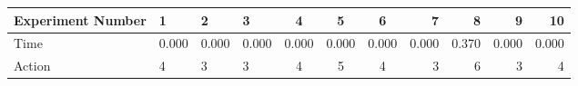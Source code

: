 \documentclass[8pt]{article}
\begin{document}
\begin{landscape}
\begin{tabular}{ | l | l | l | l | c | c | c | r | r | r | r | }
 \hline 
Experiment Number & 1 & 2 & 3 & 4 & 5 & 6 & 7 & 8 & 9 & 10\\ \hline
Time & 0.000 & 0.000 & 0.000 & 0.000 & 0.000 & 0.000 & 0.000 & 0.370 & 0.000 & 0.000\\ \hline
Action & 4 & 3 & 3 & 4 & 5 & 4 & 3 & 6 & 3 & 4\\ \hline\end{tabular}
\end{landscape}
\end{document}
